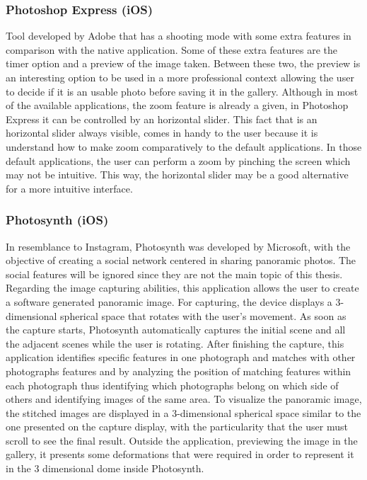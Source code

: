 \subsubsection{Photoshop Express (iOS)}

Tool developed by Adobe that has a shooting mode with some extra features in comparison with the native application. Some of these extra features are the timer option and a preview of the image taken.
Between these two, the preview is an interesting option to be used in a more professional context allowing the user to decide if it is an usable photo before saving it in the gallery.
Although in most of the available applications, the zoom feature is already a given, in Photoshop Express it can be controlled by an horizontal slider. This fact that is an horizontal slider always visible, comes in handy to the user because it is understand how to make zoom comparatively to the default applications. 
In those default applications, the user can perform a zoom by pinching the screen which may not be intuitive. This way, the horizontal slider may be a good alternative for a more intuitive interface.

\subsubsection{Photosynth (iOS)}

In resemblance to Instagram, Photosynth was developed by Microsoft, with the objective of creating a social network centered in sharing panoramic photos. The social features will be ignored since they are not the main topic of this thesis.
Regarding the image capturing abilities, this application allows the user to create a software generated panoramic image. For capturing, the device displays a 3-dimensional spherical space that rotates with the user’s movement. As soon as the capture starts, Photosynth automatically captures the initial scene and all the adjacent scenes while the user is rotating. After finishing the capture, this application identifies specific features in one photograph and matches with other photographs features and by analyzing the position of matching features within each photograph thus identifying which photographs belong on which side of others and identifying images of the same area. 
To visualize the panoramic image, the stitched images are displayed in a 3-dimensional spherical space similar to the one presented on the capture display, with the particularity that the user must scroll to see the final result. Outside the application, previewing the image in the gallery, it presents some deformations that were required in order to represent it in the 3 dimensional dome inside Photosynth. 


